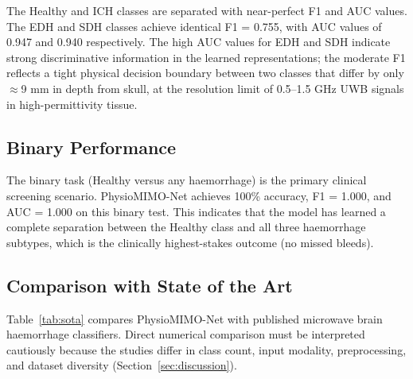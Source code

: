 \documentclass[journal]{IEEEtran}
\begin{document}
The Healthy and ICH classes are separated with near-perfect
F1 and AUC values.  The EDH and SDH classes achieve identical
F1 = 0.755, with AUC values of 0.947 and 0.940 respectively.
The high AUC values for EDH and SDH indicate strong
discriminative information in the learned representations;
the moderate F1 reflects a tight physical decision boundary
between two classes that differ by only $\approx$9 mm in
depth from skull, at the resolution limit of 0.5--1.5 GHz
UWB signals in high-permittivity tissue.

\subsection{Binary Performance}

The binary task (Healthy versus any haemorrhage) is the
primary clinical screening scenario.  PhysioMIMO-Net achieves
100\% accuracy, F1 = 1.000, and AUC = 1.000 on this binary
test.  This indicates that the model has learned a complete
separation between the Healthy class and all three haemorrhage
subtypes, which is the clinically highest-stakes outcome
(no missed bleeds).

\subsection{Comparison with State of the Art}

Table~\ref{tab:sota} compares PhysioMIMO-Net with published
microwave brain haemorrhage classifiers.  Direct numerical
comparison must be interpreted cautiously because the studies
differ in class count, input modality, preprocessing, and
dataset diversity (Section~\ref{sec:discussion}).
\end{document}
